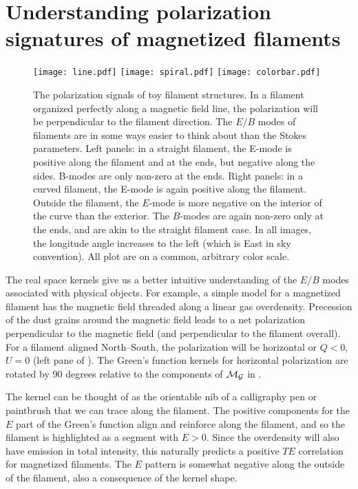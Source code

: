\section{Understanding polarization signatures of magnetized filaments}
% 
\begin{figure}[t]
\texttt{[image: line.pdf]}
\texttt{[image: spiral.pdf]}
\texttt{[image: colorbar.pdf]}
\caption{ The polarization signals of toy filament structures. In a filament organized perfectly along a magnetic field line, the polarization will be perpendicular to the filament direction.  The $E/B$ modes of filaments are in some ways easier to think about than the Stokes parameters. Left panels: in a straight filament, the E-mode is positive along the filament and at the ends, but negative along the sides.  B-modes are only non-zero at the ends.  Right panels: in a curved filament, the E-mode is again positive along the filament.  Outside the filament, the $E$-mode is more negative on the interior of the curve than the exterior.  The $B$-modes are again non-zero only at the ends, and are akin to the straight filament case. In all images, the longitude angle increases to the left (which is East in sky convention).  All plot are on a common, arbitrary color scale.}
\label{fig:polfilaments}
\end{figure}
%

The real space kernels give us a better intuitive understanding of the $E/B$ modes associated with physical objects.  For example, a simple model for a magnetized filament has the magnetic field threaded along a linear gas overdensity.  Precession of the dust grains around the magnetic field leads to a net polarization perpendicular to the magnetic field (and perpendicular to the filament overall).  For a filament aligned North--South, the polarization will be horizontal or $Q<0$, $U=0$ (left pane of ).  The Green's function kernels for horizontal polarization are rotated by 90 degrees relative to the components of $\cal{M}_G$ in .

The kernel can be thought of as the orientable nib of a calligraphy pen or paintbrush that we can trace along the filament.  The positive components for the $E$ part of the Green's function align and reinforce along the filament, and so the filament is highlighted as a segment with $E>0$.  Since the overdensity will also have emission in total intensity, this naturally predicts a positive $TE$ correlation for magnetized filaments.  The $E$ pattern is somewhat negative along the outside of the filament, also a consequence of the kernel shape.

